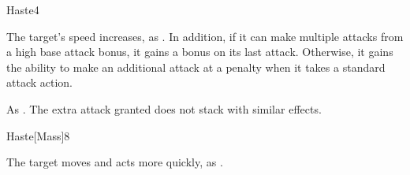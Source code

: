 \begin{spellsection}{Haste}{4}
\begin{spellheader}
\end{spellheader}
\begin{spellcontent}
    \begin{spelltargetinginfo}
    \end{spelltargetinginfo}
    \begin{spelleffects}
        \spelleffect The target's speed increases, as . In addition, if it can make multiple attacks from a high base attack bonus, it gains a  bonus on its last attack. Otherwise, it gains the ability to make an additional attack at a  penalty when it takes a standard attack action.
        \spelldur \durshort
    \end{spelleffects}
\end{spellcontent}
\begin{spellfooter}
    \spellnotes As . The extra attack granted does not stack with similar effects.
\end{spellfooter}
\end{spellsection}

\begin{spellsection}{Haste}[Mass]{8}
\begin{spellheader}
\end{spellheader}
\begin{spellcontent}
    \begin{spelltargetinginfo}
    \end{spelltargetinginfo}
    \begin{spelleffects}
        \spelleffect The target moves and acts more quickly, as .
    \end{spelleffects}
\end{spellcontent}
\begin{spellfooter}
\end{spellfooter}
\end{spellsection}

